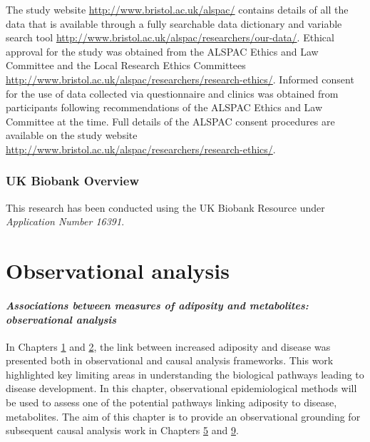 \documentclass[11pt,twoside]{bristolthesis}
\begin{document}
The study website \url{http://www.bristol.ac.uk/alspac/} contains details of all the data that is available through a fully searchable data dictionary and variable search tool \url{http://www.bristol.ac.uk/alspac/researchers/our-data/}. Ethical approval for the study was obtained from the ALSPAC Ethics and Law Committee and the Local Research Ethics Committees \url{http://www.bristol.ac.uk/alspac/researchers/research-ethics/}. Informed consent for the use of data collected via questionnaire and clinics was obtained from participants following recommendations of the ALSPAC Ethics and Law Committee at the time. Full details of the ALSPAC consent procedures are available on the study website \url{http://www.bristol.ac.uk/alspac/researchers/research-ethics/}.

\hypertarget{supp-biobank}{%
\subsection{UK Biobank Overview}\label{supp-biobank}}

This research has been conducted using the UK Biobank Resource under \emph{Application Number 16391}.

\hypertarget{chapter4}{%
\chapter{Observational analysis}\label{chapter4}}

\hypertarget{associations-between-measures-of-adiposity-and-metabolites-observational-analysis}{%
\subsubsection{\texorpdfstring{\emph{Associations between measures of adiposity and metabolites: observational analysis}}{Associations between measures of adiposity and metabolites: observational analysis}}\label{associations-between-measures-of-adiposity-and-metabolites-observational-analysis}}

In Chapters \protect\hyperlink{chapter1}{1} and \protect\hyperlink{chapter2}{2}, the link between increased adiposity and disease was presented both in observational and causal analysis frameworks. This work highlighted key limiting areas in understanding the biological pathways leading to disease development. In this chapter, observational epidemiological methods will be used to assess one of the potential pathways linking adiposity to disease, metabolites. The aim of this chapter is to provide an observational grounding for subsequent causal analysis work in Chapters \protect\hyperlink{chapter5}{5} and \protect\hyperlink{chapter9}{9}.
\end{document}

